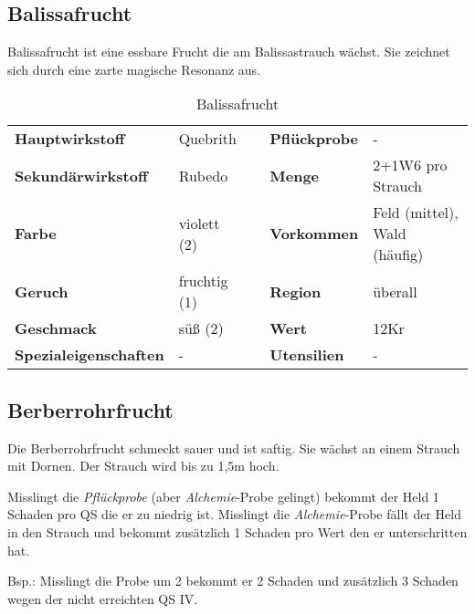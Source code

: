 \subsection{Balissafrucht}
Balissafrucht ist eine essbare Frucht die am Balissastrauch wächst. Sie zeichnet sich durch eine zarte magische Resonanz aus. 

\begin{table}[h]
\begin{center}
\begin{tabular}{|l|l|p{1cm}|l|l|}
	\cline{1-2} \cline{4-5}
	\textbf{Hauptwirkstoff} & Quebrith && \textbf{Pflückprobe} & - \\ \cline{1-2} \cline{4-5}
	\textbf{Sekundärwirkstoff} & Rubedo && \textbf{Menge} & 2+1W6 pro Strauch \\ \cline{1-2} \cline{4-5}
	\textbf{Farbe} & violett (2) && \textbf{Vorkommen} & Feld (mittel), Wald (häufig) \\ \cline{1-2} \cline{4-5}
	\textbf{Geruch} & fruchtig (1) && \textbf{Region} & überall \\ \cline{1-2} \cline{4-5}
	\textbf{Geschmack} & süß (2) && \textbf{Wert} & 12Kr \\ \cline{1-2} \cline{4-5}
	\textbf{Spezialeigenschaften} & - && \textbf{Utensilien} & - \\ \cline{1-2} \cline{4-5}
\end{tabular}
\end{center}
\caption{Balissafrucht}
\label{tab:balissafrucht}
\end{table}


\subsection{Berberrohrfrucht}
Die Berberrohrfrucht schmeckt sauer und ist saftig. Sie wächst an einem Strauch mit Dornen. Der Strauch wird bis zu 1,5m hoch. 

Misslingt die \textit{Pflückprobe} (aber \textit{Alchemie}-Probe gelingt) bekommt der Held 1 Schaden pro QS die er zu niedrig ist. Misslingt die \textit{Alchemie}-Probe fällt der Held in den Strauch und bekommt zusätzlich 1 Schaden pro Wert den er unterschritten hat. 

Bsp.: Misslingt die Probe um 2 bekommt er 2 Schaden und zusätzlich 3 Schaden wegen der nicht erreichten QS IV.

\newpage

